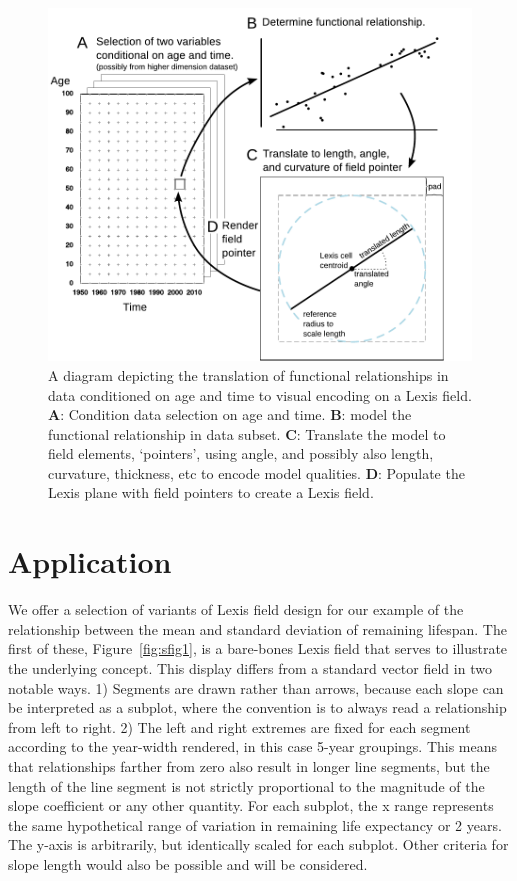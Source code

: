 \documentclass{article}
\begin{document}
\begin{figure}[ht!]
  \centering
  \includegraphics[scale=.8]{Figures/ExplainerDiagram.pdf}
  \caption{A diagram depicting the translation of functional relationships in data conditioned on age and time to visual encoding on a Lexis field. \textbf{A}: Condition data selection on age and time. \textbf{B}: model the functional relationship in data subset. \textbf{C}: Translate the model to field elements, `pointers', using angle, and possibly also length, curvature, thickness, etc to encode model qualities. \textbf{D}: Populate the Lexis plane with field pointers to create a Lexis field.}
  \label{fig:explain}
\end{figure}

\section{Application}
We offer a selection of variants of Lexis field design for our example of the relationship between the mean and standard deviation of remaining lifespan. The first of these, Figure~\ref{fig:sfig1}, is a bare-bones Lexis field that serves to illustrate the underlying concept. This display differs from a standard vector field in two notable ways. 1) Segments are drawn rather than arrows, because each slope can be
interpreted as a subplot, where the convention is to always read a
relationship from left to right. 2) The left and right extremes are fixed for
each segment according to the year-width rendered, in this case 5-year
groupings. This means that relationships farther from zero also result in longer
line segments, but the length of the line segment is not strictly proportional
to the magnitude of the slope coefficient or any other quantity. For each
subplot, the x range represents the same hypothetical range of
variation in remaining life expectancy or 2 years. The y-axis is arbitrarily,
but identically scaled for each subplot. Other criteria for slope length would
also be possible and will be considered.
\end{document}
